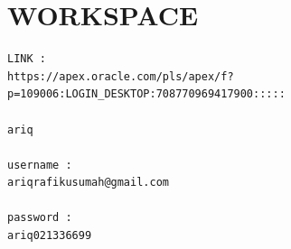 \documentclass[12pt, a4paper]{report}
\begin{document}
\chapter{WORKSPACE}
\begin{verbatim}
LINK :
https://apex.oracle.com/pls/apex/f?p=109006:LOGIN_DESKTOP:708770969417900:::::

ariq

username :
ariqrafikusumah@gmail.com

password :
ariq021336699
\end{verbatim}
\end{document}
